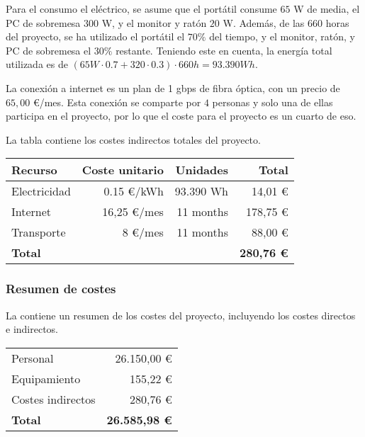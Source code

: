 Para el consumo el eléctrico, se asume que el portátil consume $65$ W de media,
el PC de sobremesa $300$ W, y el monitor y ratón $20$ W. Además, de las $660$
horas del proyecto, se ha utilizado el portátil el $70 \%$ del tiempo, y el
monitor, ratón, y PC de sobremesa el $30 \%$ restante. Teniendo este en cuenta,
la energía total utilizada es de $(65 W \cdot 0.7 + 320 \cdot 0.3) \cdot 660 h =
93.390 Wh$.

La conexión a internet es un plan de 1 gbps de fibra óptica, con un precio
de $65,00$ \euro/mes. Esta conexión se comparte por $4$ personas y solo una de
ellas participa en el proyecto, por lo que el coste para el proyecto es un
cuarto de eso.

\noindent
La tabla  contiene los costes indirectos totales del
proyecto.

\begin{table}[htb]
    {
      \begin{tabular}{lrrr}
        \toprule
        \textbf{Recurso} & \textbf{Coste unitario} & \textbf{Unidades} & \textbf{Total} \\
        \midrule
        Electricidad &   0.15 \euro/kWh & 93.390 Wh &  14,01 \euro \\
        Internet     &  16,25 \euro/mes & 11 months & 178,75 \euro \\
        Transporte   &      8 \euro/mes & 11 months &  88,00 \euro \\
        \midrule
        \textbf{Total} & & & \textbf{280,76 \euro} \\
        \bottomrule
      \end{tabular}
    }
\end{table}

\subsubsection{Resumen de costes}\label{subsubsec:costs-summary}

\noindent
La  contiene un resumen de los costes del proyecto,
incluyendo los costes directos e indirectos.

\begin{table}[htb]
    {
      \begin{tabular}{lr}
        \toprule
        Personal          & 26.150,00 \euro \\
        Equipamiento      &    155,22 \euro \\
        Costes indirectos &    280,76 \euro \\
        \midrule
        \textbf{Total}    & \textbf{26.585,98 \euro} \\
        \bottomrule
      \end{tabular}
    }
\end{table}

